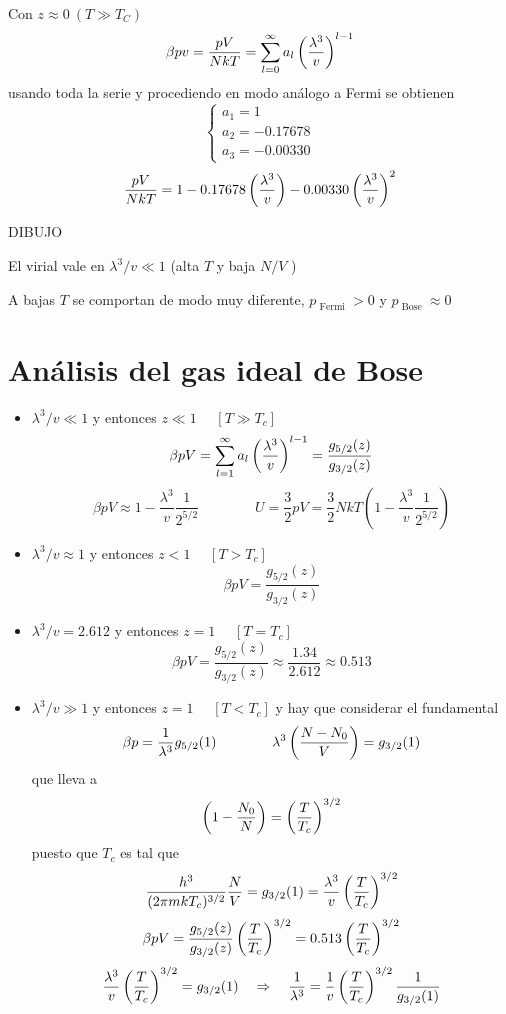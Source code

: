 \documentclass[10pt,oneside]{CBFT_book}
\begin{document}
Con $ z \approx 0 \: ( T \gg T_C ) $
\[
	\beta p v = \frac{pV}{NkT} = \sum_{l=0}^\infty a_l \left( \frac{ \lambda^3 }{ v } \right)^{l-1}
\]
usando toda la serie y procediendo en modo análogo a Fermi se obtienen
\[
	\begin{cases}
	 a_1 = 1 \\
	 a_2 = -0.17678 \\
	 a_3 = -0.00330
	\end{cases}
\]
\[
	\frac{pV}{NkT} = 1 - 0.17678 \left( \frac{ \lambda^3 }{ v } \right) - 0.00330 \left( \frac{ \lambda^3 }{ v } \right)^2
\]

DIBUJO 

El virial vale en $\lambda^3/v \ll 1$ (alta $T$ y baja $N/V$ )

A bajas $T$ se comportan de modo muy diferente, $p_{\text{ Fermi }} > 0 $ y
$p_{\text{ Bose }} \approx 0$

\section{Análisis del gas ideal de Bose}

\begin{itemize}
 \item $ \lambda^3 / v \ll 1 $ y entonces $ z \ll 1 $ $\quad  [T \gg T_c ] $
 \[
	\beta p V = \sum_{l=1}^\infty a_l \left( \frac{ \lambda^3 }{ v } \right)^{l-1} = \frac{ g_{5/2}(z) }{ g_{3/2}(z) }
 \]
 \[
	\beta p V \approx 1 - \frac{\lambda^3}{v} \frac{1}{2^{5/2}} \qquad \qquad 
	U = \frac{3}{2}pV = \frac{3}{2} NkT \left( 1 - \frac{\lambda^3}{v} \frac{1}{2^{5/2}} \right)
 \]
 \item $ \lambda^3 / v \approx 1 $ y entonces $ z < 1 $ $\quad  [T > T_c ] $
 \[
	\beta p V = \frac{ g_{5/2}(z) }{ g_{3/2}(z) }
 \]
 \item  $ \lambda^3 / v = 2.612 $ y entonces $ z = 1 $ $\quad  [T = T_c ] $
 \[
	\beta p V = \frac{ g_{5/2}(z) }{ g_{3/2}(z) } \approx \frac{1.34}{2.612} \approx 0.513
 \]
 \item $ \lambda^3 / v \gg 1 $ y entonces $ z = 1 $ $\quad  [T < T_c ] $ y hay que considerar el 
 fundamental
 \[
	\beta p = \frac{1}{\lambda^3} g_{5/2}(1) \qquad \qquad \lambda^3\left( \frac{ N-N_0 }{ V } \right) = g_{3/2}(1)
 \]
 que lleva a 
 \[
	\left( 1 - \frac{N_0}{N} \right) = \left( \frac{ T }{ T_c } \right)^{3/2}
 \]
 puesto que $T_c$ es tal que 
 \[
	\frac{h^3}{(2\pi m kT_c)^{3/2}} \frac{N}{V} = g_{3/2}(1) = \frac{\lambda^3}{v}\left( \frac{ T }{ T_c } \right)^{3/2}
 \]
 \[
	\beta p V = \frac{ g_{5/2}(z) }{ g_{3/2}(z) } \left( \frac{ T }{ T_c } \right)^{3/2} = 0.513 \left( \frac{ T }{ T_c } \right)^{3/2}
 \]
 \[
	\frac{\lambda^3}{v} \left( \frac{ T }{ T_c } \right)^{3/2} = g_{3/2}(1) \quad \Rightarrow \quad \frac{1}{\lambda^3} =
	\frac{1}{v}\left( \frac{ T }{ T_c } \right)^{3/2} \frac{1}{g_{3/2}(1)}
 \]
\end{itemize}
\end{document}
